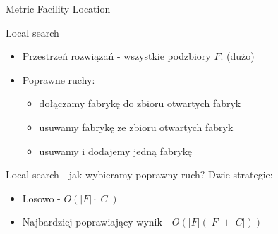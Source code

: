 \begin{frame}{Metric Facility Location}
  \begin{block}{Local search}
    \begin{itemize}
      \pause
      \item Przestrzeń rozwiązań - wszystkie podzbiory $F$. (dużo)
      \pause
      \item Poprawne ruchy:
        \begin{itemize}
          \item dołączamy fabrykę do zbioru otwartych fabryk
          \item usuwamy fabrykę ze zbioru otwartych fabryk
          \item usuwamy i dodajemy jedną fabrykę
        \end{itemize}
    \end{itemize}
  \end{block}

  \pause
  \begin{block}{Local search - jak wybieramy poprawny ruch?}
    Dwie strategie:
    \begin{itemize}
      \item Losowo - $O(|F|\cdot |C|)$
      \item Najbardziej poprawiający wynik - $O(|F|(|F| + |C|))$
    \end{itemize}
  \end{block}
\end{frame}

\begin{frame}

\end{frame}

\begin{frame}

\end{frame}
